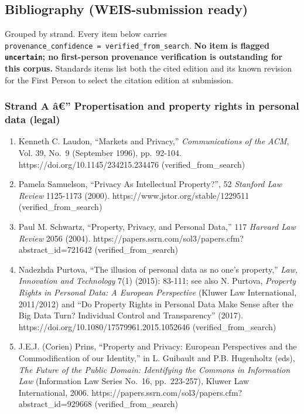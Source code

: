 \documentclass[
  11pt,
]{article}
\providecommand{\tightlist}{%
  \setlength{\itemsep}{0pt}\setlength{\parskip}{0pt}}
\begin{document}
\subsection{Bibliography (WEIS-submission
ready)}\label{bibliography-weis-submission-ready}

Grouped by strand. Every item below carries
\texttt{provenance\_confidence\ =\ verified\_from\_search}. \textbf{No
item is flagged \texttt{uncertain}; no first-person provenance
verification is outstanding for this corpus.} Standards items list both
the cited edition and its known revision for the First Person to select
the citation edition at submission.

\subsubsection{Strand A â€'' Propertisation and property rights in
personal data
(legal)}\label{strand-a-uxe2-propertisation-and-property-rights-in-personal-data-legal}

\begin{enumerate}
\def\labelenumi{\arabic{enumi}.}
\tightlist
\item
  Kenneth C. Laudon, ``Markets and Privacy,'' \emph{Communications of
  the ACM}, Vol. 39, No.~9 (September 1996), pp.~92-104.
  https://doi.org/10.1145/234215.234476 (verified\_from\_search)
\item
  Pamela Samuelson, ``Privacy As Intellectual Property?'', 52
  \emph{Stanford Law Review} 1125-1173 (2000).
  https://www.jstor.org/stable/1229511 (verified\_from\_search)
\item
  Paul M. Schwartz, ``Property, Privacy, and Personal Data,'' 117
  \emph{Harvard Law Review} 2056 (2004).
  https://papers.ssrn.com/sol3/papers.cfm?abstract\_id=721642
  (verified\_from\_search)
\item
  Nadezhda Purtova, ``The illusion of personal data as no one's
  property,'' \emph{Law, Innovation and Technology} 7(1) (2015): 83-111;
  see also N. Purtova, \emph{Property Rights in Personal Data: A
  European Perspective} (Kluwer Law International, 2011/2012) and ``Do
  Property Rights in Personal Data Make Sense after the Big Data Turn?
  Individual Control and Transparency'' (2017).
  https://doi.org/10.1080/17579961.2015.1052646 (verified\_from\_search)
\item
  J.E.J. (Corien) Prins, ``Property and Privacy: European Perspectives
  and the Commodification of our Identity,'' in L. Guibault and P.B.
  Hugenholtz (eds), \emph{The Future of the Public Domain: Identifying
  the Commons in Information Law} (Information Law Series No.~16,
  pp.~223-257), Kluwer Law International, 2006.
  https://papers.ssrn.com/sol3/papers.cfm?abstract\_id=929668
  (verified\_from\_search)
\end{enumerate}
\end{document}
